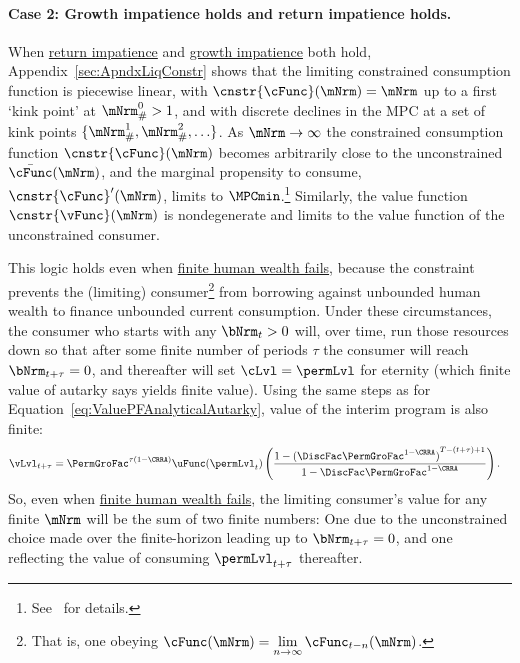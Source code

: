 \documentclass[BufferStockTheory]{subfiles}
\begin{document}
\paragraph{Case 2: Growth impatience holds and return impatience holds.}  When  \hyperlink{RIC}{return impatience} and  \hyperlink{GICRaw}{growth impatience} both hold, Appendix~\ref{sec:ApndxLiqConstr} shows that the limiting constrained consumption function is piecewise linear, with $\cnstr{\cFunc}(\mNrm)=\mNrm$ up to a first `kink point' at $\mNrm_{\#}^{0}>1$, and with discrete declines in the MPC at a set of kink points $\{\mNrm_{\#}^{1},\mNrm_{\#}^{2},\ldots\}$.  As $\mNrm \rightarrow \infty$ the constrained consumption function $\cnstr{\cFunc}(\mNrm)$ becomes arbitrarily close to the unconstrained $\bar{\cFunc}(\mNrm)$, and the marginal propensity to consume, $\cnstr{\cFunc}^{\prime}(\mNrm)$, limits to $\MPCmin$.\footnote{See~\cite{chkLiqConstr} for details.}  Similarly, the value function $\cnstr{\vFunc}(\mNrm)$ is nondegenerate and limits to the value function of the unconstrained consumer.


This logic holds even when \hyperlink{FHWC}{finite human wealth fails}, because the constraint prevents the (limiting) consumer\footnote{That is, one obeying $\cFunc(\mNrm) = \lim\limits_{n \rightarrow \infty} \cFunc_{t-n}(\mNrm)$.} from borrowing against unbounded human wealth to finance unbounded current consumption.  Under these circumstances, the consumer who starts with any $\bNrm_{t} > 0$ will, over time, run those resources down so that after some finite number of periods $\tau$ the consumer will reach $\bNrm_{t+\tau} = 0$, and thereafter will set $\cLvl = \permLvl$ for eternity (which \hypertarget{PFFVAC}{finite value of autarky} says yields finite value).  Using the same steps as for Equation~\eqref{eq:ValuePFAnalyticalAutarky}, value of the interim program is also finite: \hypertarget{PFFVAC}{} \hypertarget{PFVAFacDefn}{}
\begin{align*}
  \vLvl_{t+\tau} 
  & = \PermGroFac^{\tau(1-\CRRA)} \uFunc(\permLvl_{t})\left(\frac{1-{(\DiscFac \PermGroFac^{1-\CRRA})}^{T-(t+\tau)+1}}{1-\DiscFac \PermGroFac^{1-\CRRA}}\right).
\end{align*}
So, even when \hyperlink{FHWC}{finite human wealth fails}, the limiting consumer's value for any finite $\mNrm$ will be the sum of two finite numbers: One due to the unconstrained choice made over the finite-horizon leading up to $\bNrm_{t+\tau} = 0$, and one reflecting the value of consuming $\permLvl_{t+\tau}$ thereafter.
\end{document}
